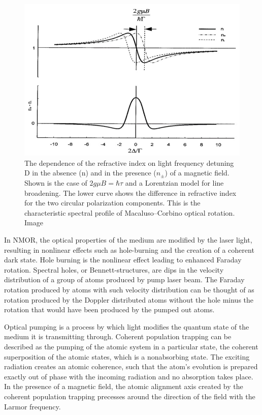 \begin{figure}[h]
\centering
\includegraphics[width=0.65\linewidth]{figures/farday.jpg}
\caption{The dependence of the refractive index on light frequency detuning
D in the absence (n) and in the presence ($n_\pm$) of a magnetic field. Shown is
the case of $2g\mu B=\hbar\tau$ and a Lorentzian model for line broadening. The
lower curve shows the difference in refractive index for the two circular
polarization components. This is the characteristic spectral profile of Macaluso–Corbino optical rotation. Image\cite{bib:NMOR1998}\label{fig:Faraday}}
\end{figure}
 
In NMOR, the optical properties of the medium are modified by the laser light, resulting in nonlinear effects such as hole-burning and the creation of a coherent dark state.     
Hole burning is the  nonlinear
effect leading to enhanced Faraday rotation. Spectral holes, or Bennett-structures, are dips in the velocity distribution of a group of atoms produced by pump laser beam. The Faraday rotation produced by atoms with such velocity distribution can be thought of as rotation produced by the Doppler distributed atoms without the hole minus the rotation that would have been produced by the pumped out atoms.

Optical pumping is a process by which light modifies the quantum state of the medium it is transmitting through. Coherent population trapping can be described as the pumping of the atomic system in a particular state, the coherent superposition of the atomic states, which is a nonabsorbing state. The exciting radiation creates an atomic coherence, such that the atom's evolution is prepared exactly out of phase with the incoming radiation and no absorption takes place. In the presence of a magnetic field, the atomic alignment
axis created by the coherent population trapping precesses
around the direction of the field with the Larmor frequency.


